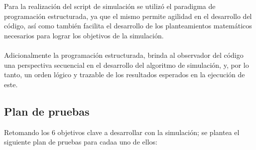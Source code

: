 \documentclass[12pt]{article}
\begin{document}

    

    Para la realización del script de simulación se utilizó el paradigma de programación estructurada, ya 
    que el mismo permite agilidad en el desarrollo del código, así como también facilita el desarrollo de los 
    planteamientos matemáticos necesarios para lograr los objetivos de la simulación.\\
    \\
    Adicionalmente la programación estructurada, brinda al observador del código una perspectiva secuencial en 
    el desarrollo del algoritmo de simulación, y, por lo tanto, un orden lógico y trazable de los resultados 
    esperados en la ejecución de este.\\
    
    \subsection*{Plan de pruebas}
        Retomando los 6 objetivos clave a desarrollar con la simulación; se plantea el siguiente plan de pruebas 
        para cadaa uno de ellos:
\end{document}
